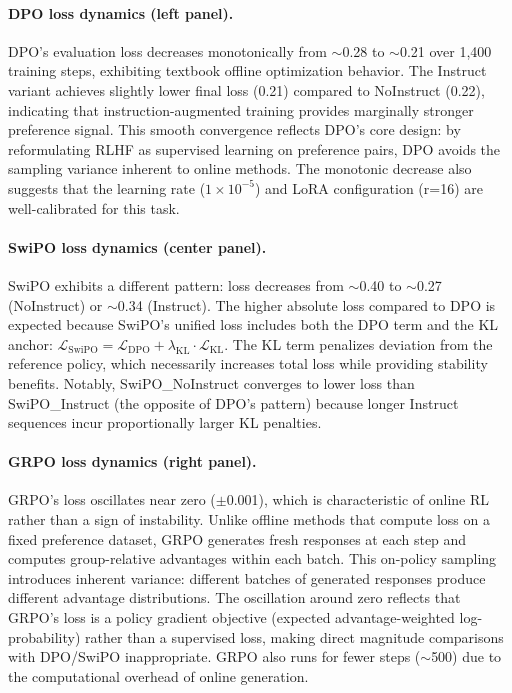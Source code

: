 \paragraph{DPO loss dynamics (left panel).}
DPO's evaluation loss decreases monotonically from $\sim$0.28 to $\sim$0.21 over 1,400 training steps, exhibiting textbook offline optimization behavior.
The Instruct variant achieves slightly lower final loss (0.21) compared to NoInstruct (0.22), indicating that instruction-augmented training provides marginally stronger preference signal.
This smooth convergence reflects DPO's core design: by reformulating RLHF as supervised learning on preference pairs, DPO avoids the sampling variance inherent to online methods.
The monotonic decrease also suggests that the learning rate ($1 \times 10^{-5}$) and LoRA configuration (r=16) are well-calibrated for this task.

\paragraph{SwiPO loss dynamics (center panel).}
SwiPO exhibits a different pattern: loss decreases from $\sim$0.40 to $\sim$0.27 (NoInstruct) or $\sim$0.34 (Instruct).
The higher absolute loss compared to DPO is expected because SwiPO's unified loss includes both the DPO term and the KL anchor: $\mathcal{L}_{\mathrm{SwiPO}} = \mathcal{L}_{\text{DPO}} + \lambda_{\text{KL}} \cdot \mathcal{L}_{\text{KL}}$.
The KL term penalizes deviation from the reference policy, which necessarily increases total loss while providing stability benefits.
Notably, SwiPO\_NoInstruct converges to lower loss than SwiPO\_Instruct (the opposite of DPO's pattern) because longer Instruct sequences incur proportionally larger KL penalties.

\paragraph{GRPO loss dynamics (right panel).}
GRPO's loss oscillates near zero ($\pm$0.001), which is characteristic of online RL rather than a sign of instability.
Unlike offline methods that compute loss on a fixed preference dataset, GRPO generates fresh responses at each step and computes group-relative advantages within each batch.
This on-policy sampling introduces inherent variance: different batches of generated responses produce different advantage distributions.
The oscillation around zero reflects that GRPO's loss is a policy gradient objective (expected advantage-weighted log-probability) rather than a supervised loss, making direct magnitude comparisons with DPO/SwiPO inappropriate.
GRPO also runs for fewer steps ($\sim$500) due to the computational overhead of online generation.

